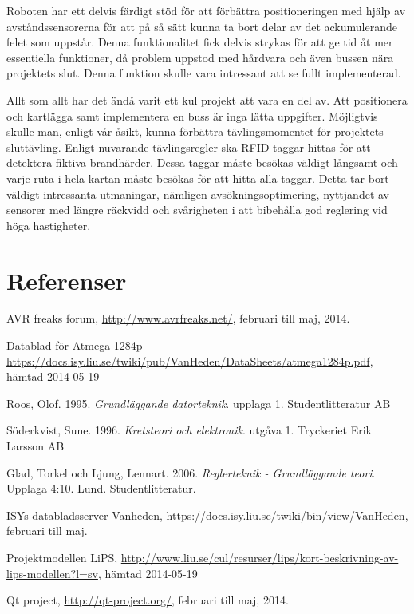 \documentclass[a4paper,12pt,fleqn]{article}
\begin{document}
Roboten har ett delvis färdigt stöd för att förbättra positioneringen med hjälp av avståndssensorerna för att på så sätt kunna ta bort delar av det ackumulerande felet som uppstår. Denna funktionalitet fick delvis strykas för att ge tid åt mer essentiella funktioner, då problem uppstod med hårdvara och även bussen nära projektets slut. Denna funktion skulle vara intressant att se fullt implementerad.  

Allt som allt har det ändå varit ett kul projekt att vara en del av. Att positionera och kartlägga samt implementera en buss är inga lätta uppgifter. Möjligtvis skulle man, enligt vår åsikt, kunna förbättra tävlingsmomentet för projektets sluttävling. Enligt nuvarande tävlingsregler ska RFID-taggar hittas för att detektera fiktiva brandhärder. Dessa taggar måste besökas väldigt långsamt och varje ruta i hela kartan måste besökas för att hitta alla taggar. Detta tar bort väldigt intressanta utmaningar, nämligen avsökningsoptimering, nyttjandet av sensorer med längre räckvidd och svårigheten i att bibehålla god reglering vid höga hastigheter. 

\newpage
\section*{Referenser}

AVR freaks forum, \url{http://www.avrfreaks.net/}, februari till maj, 2014.

Datablad för Atmega 1284p \url{https://docs.isy.liu.se/twiki/pub/VanHeden/DataSheets/atmega1284p.pdf}, hämtad 2014-05-19

Roos, Olof. 1995. \textit{Grundläggande datorteknik}. upplaga 1. Studentlitteratur AB

Söderkvist, Sune. 1996. \textit{Kretsteori och elektronik}. utgåva 1. Tryckeriet Erik Larsson AB

Glad, Torkel och Ljung, Lennart. 2006. \textit{Reglerteknik - Grundläggande teori}. Upplaga 4:10. Lund. Studentlitteratur.

ISYs databladsserver Vanheden, \url{https://docs.isy.liu.se/twiki/bin/view/VanHeden}, februari till maj.

Projektmodellen LiPS, \url{http://www.liu.se/cul/resurser/lips/kort-beskrivning-av-lips-modellen?l=sv}, hämtad 2014-05-19

Qt project, \url{http://qt-project.org/}, februari till maj, 2014. 
\end{document}
